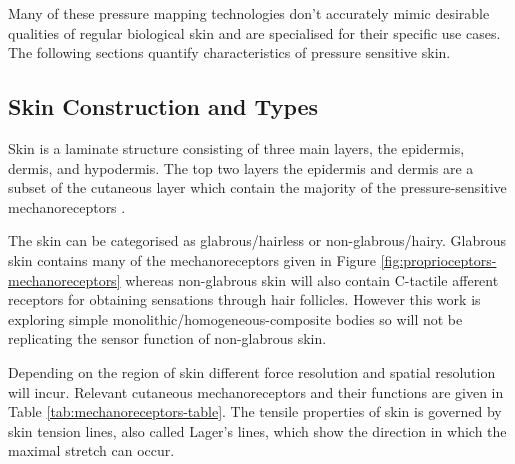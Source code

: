 \begin{figure}[H]
    \label{fig:mechano-tech}
\end{figure}
Many of these pressure mapping technologies don't accurately mimic desirable qualities of regular biological skin and are specialised for their specific use cases. The following sections quantify characteristics of pressure sensitive skin.

\subsection{Skin Construction and Types}
Skin is a laminate structure consisting of three main layers, the epidermis, dermis, and hypodermis. The top two layers the epidermis and dermis are a subset of the cutaneous layer which contain the majority of the pressure-sensitive mechanoreceptors \cite{McGrath2010}.

The skin can be categorised as glabrous/hairless or non-glabrous/hairy. Glabrous skin contains many of the mechanoreceptors given in Figure \ref{fig:proprioceptors-mechanoreceptors} whereas non-glabrous skin will also contain C-tactile afferent receptors for obtaining sensations through hair follicles. However this work is exploring simple monolithic/homogeneous-composite bodies so will not be replicating the sensor function of non-glabrous skin.

Depending on the region of skin different force resolution and spatial resolution will incur. Relevant cutaneous mechanoreceptors and their functions are given in Table \ref{tab:mechanoreceptors-table}. The tensile properties of skin is governed by skin tension lines, also called Lager's lines, which show the direction in which the maximal stretch can occur. 

